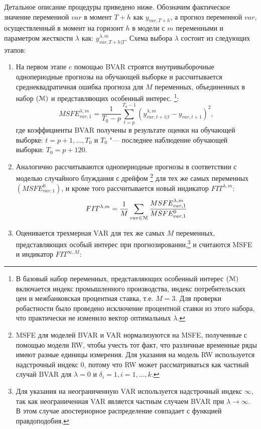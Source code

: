 \documentclass[11pt]{article} %
\begin{document}
Детальное описание процедуры приведено ниже. Обозначим фактическое значение переменной $var$ в момент $T+h$ как $y_{var,T+h}$, а прогноз переменной $var$, осуществленный в момент на горизонт $h$ в модели с $m$ переменными  и параметром жесткости $\lambda$  как: $y_{var, T+h|T}^{\lambda,m}$.
Схема выбора $\lambda$ состоит из следующих этапов:


\begin{enumerate}
\item На первом этапе c помощью BVAR строятся внутривыборочные однопериодные прогнозы на обучающей выборке и рассчитывается среднеквадратичная ошибка прогноза для $M$ переменных, объединенных в набор $(\EuScript{M})$ и представляющих особенный интерес. \footnote{В базовый набор переменных, представляющих особенный интерес $(\EuScript{M})$ включается индекс промышленного производства, индекс потребительских цен и межбанковская процентная ставка, т.е.  $M=3$. Для проверки робастности было проведено исключение процентной ставки из этого набора, что практически не изменило вектор оптимальных  $\lambda$.}:
\begin{equation}
MSFE_{var,1}^{\lambda,m}=\frac{1}{T_0 - p}\sum_{t=p}^{T_0-1} \left(y_{var,t+1|t}^{\lambda,m}-y_{var,t+1}\right)^2,
\end{equation}
\noindent где коэффициенты BVAR получены в результате оценки на обучающей выборке: $t=p+1,\ldots, T_0$ и $T_0$ "--- последнее наблюдение обучающей выборки: $T_0=p+120$.
\item Аналогично рассчитываются однопериодные прогнозы в соответствии с моделью случайного блуждания с дрейфом \footnote{MSFE для  моделей BVAR и  VAR нормализуются на MSFE, полученные с помощью модели RW, чтобы учесть тот факт, что различные временные ряды имеют разные единицы измерения. Для указания на модель RW используется надстрочный индекс 0, потому что RW может рассматриваться как частный случай BVAR для $\lambda=0$ и $\delta_i=1, i=1,\ldots,k$.} для тех же самых переменных $\left(MSFE_{var,1}^0\right)$, и кроме того рассчитывается новый индикатор $FIT^{\lambda,m}$:
\begin{equation}
FIT^{\lambda,m}=\frac{1}{M} \sum_{var\in \EuScript{M}} \frac{MSFE_{var,1}^{\lambda,m}}{MSFE_{var,1}^{0}}
\end{equation}
\item Оценивается трехмерная VAR для  тех же самых $M$ переменных, представляющих особый интерес при прогнозировании,\footnote{Для указания на неограниченную VAR используется надстрочный индекс $\infty$, так как неограниченная VAR является частным случаем BVAR при $\lambda\to \infty$. В этом случае апостериорное распределение совпадает с функцией правдоподобия.}  и считаются MSFE  и индикатор  $FIT^{\infty,M}$:


\end{enumerate}
\end{document}
